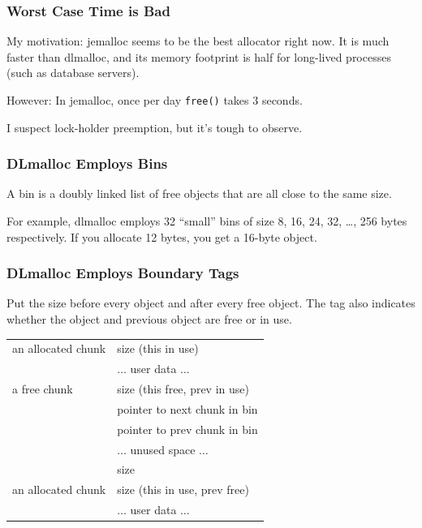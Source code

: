 \documentclass[xcolor=dvipsnames,14pt]{beamer}
\begin{document}
\begin{frame}
\frametitle{Worst Case Time is Bad}

My motivation: jemalloc seems to be the best allocator right now.  It
is much faster than dlmalloc, and its memory footprint is half for
long-lived processes (such as database servers).

\vfill
However: In jemalloc, once per day \texttt{free()} takes 3 seconds.

\vfill
I suspect lock-holder preemption, but it's tough to observe.
\end{frame}

\begin{frame}
\frametitle{DLmalloc Employs Bins}
A bin is a doubly linked list of free objects that are all close to the same size.

\vfill

For example, dlmalloc employs 32 ``small'' bins of size 8, 16, 24, 32,
\ldots, 256 bytes respectively.  If you allocate 12 bytes, you get a 16-byte object.

\end{frame}

\begin{frame}
\frametitle{DLmalloc Employs Boundary Tags}

Put the size before every object and after every free object.  The
tag also indicates whether the object and previous object are free or in use.

\begin{center}
\begin{tabular}{l|l|}
                                                    \hline
an allocated chunk & size (this in use)                \\ \cline{2-2}
                   & $\ldots$ user data $\ldots$ \\ \hline
a free chunk       & size (this free, prev in use)     \\ \cline{2-2}
                   & pointer to next chunk in bin \\ \cline{2-2}
                   & pointer to prev chunk in bin \\ \cline{2-2}
                   & $\ldots$ unused space $\ldots$ \\ \cline{2-2}
                   & size                        \\ \hline
an allocated chunk & size (this in use, prev free)    \\ \cline{2-2}
                   & $\ldots$ user data $\ldots$ \\ \hline
\end{tabular}
\end{center}
\end{frame}
\end{document}
